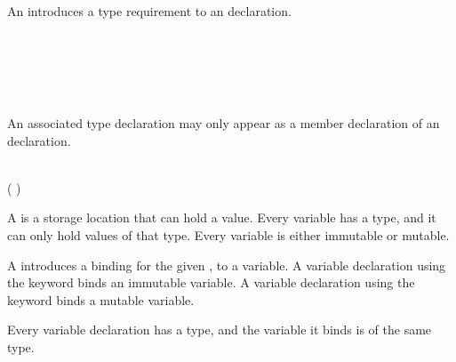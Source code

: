 
An  introduces a type requirement to an  declaration.

\begin{Syntax}
     \\
          \\
        \SynOpt \\
        \SynOpt \\
        \SynOpt \code{;}
\end{Syntax}

An associated type declaration may only appear as a member declaration of an  declaration.



\begin{Syntax}
     \\
        ( \SynOr {}) 
            \SynOpt
            \SynOpt \code{;}
    
        \code{:} 
    
        \code{=} 
\end{Syntax}

A  is a storage location that can hold a value.
Every variable has a type, and it can only hold values of that type.
Every variable is either immutable or mutable.

A  introduces a binding for the given , to a variable.
A variable declaration using the  keyword binds an immutable variable.
A variable declaration using the  keyword binds a mutable variable.

Every variable declaration has a type, and the variable it binds is of the same type.


